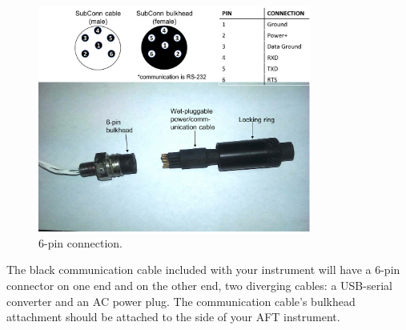 \begin{figure}[t]
\centering
\includegraphics[width=0.8\textwidth]{figs/Subconn_cable.png}
\caption{\instType{} 6-pin connection.}
\label{fig:Subconn}
\end{figure}

\or		%

The black communication cable included with your instrument will have a 6-pin connector on one end and on the other end, two diverging cables: a USB-serial converter and an AC power plug. The communication cable's bulkhead attachment should be attached to the side of your AFT instrument.  

